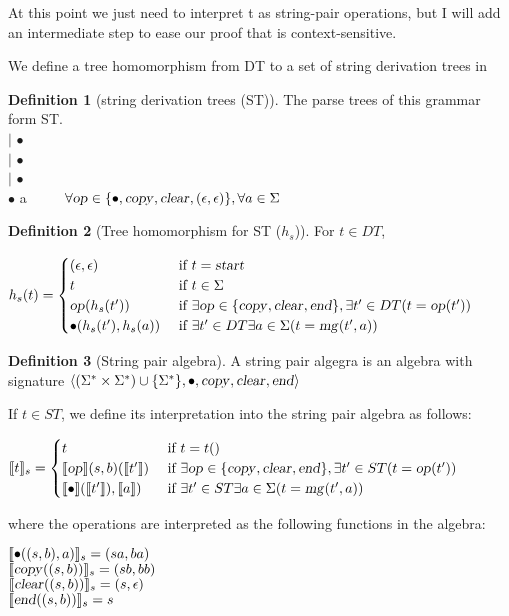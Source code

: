 \documentclass[12pt]{article}
\theoremstyle{definition}
\newtheorem{definition}{Definition}[section]
\begin{document}
At this point we just need to interpret t as string-pair operations, but I will add an intermediate step to ease our proof that \OURG is context-sensitive.

We define a tree homomorphism from DT to a set of string derivation trees in

\begin{definition}[string derivation trees (ST)]
  The parse trees of this grammar form ST.\\
  
\noindent  \cp \arr \cp $|$ $\bullet$\\
  \cl \arr \cp $|$ $\bullet$\\
  \ed \arr \cp $|$ $\bullet$\\
  $\bullet$ \arr \op a ~~~~ $\forall \text{\textsl{op}}\in \{\bullet,\text{\textsl{copy}},\text{\textsl{clear}},(\epsilon,\epsilon)\}, \forall a\in\Sigma$
\end{definition}


\begin{definition}[Tree homomorphism for ST ($h_s$)]

  For $t\in DT$, 
  
  $
  h_s(t) =
  \begin{cases}
    (\epsilon,\epsilon) & \text{ if } t = \text{\textsl{start}}\\
    t & \text{ if } t\in\Sigma\\
    \text{\textsl{op}}(h_s(t')) & \text{ if } \exists \text{\textsl{op}} \in \{\text{\textsl{copy}},\text{\textsl{clear}},\text{\textsl{end}}\}, \exists t'\in DT (t=\text{\textsl{op}}(t'))\\
    \bullet(h_s(t'), h_s(a)) & \text{ if } \exists t'\in DT \exists a\in\Sigma (t=\text{\textsl{mg}}(t',a))\\
  \end{cases}
  $
\end{definition}


\begin{definition}[String pair algebra]
  A string pair algegra is an algebra with signature $\langle (\Sigma^*\times\Sigma^*)\cup\{\Sigma^*\},\bullet,\text{\textsl{copy}},\text{\textsl{clear}},\text{\textsl{end}}\rangle$
  
  If $t\in ST$, we define its interpretation into the string pair algebra as follows:

   $
  \llbracket t \rrbracket_s =
  \begin{cases}
    t & \text{ if } t = t()\\
    \llbracket\text{\textsl{op}}\rrbracket(s,b)(\llbracket t'\rrbracket) & \text{ if } \exists \text{\textsl{op}} \in \{\text{\textsl{copy}},\text{\textsl{clear}},\text{\textsl{end}}\}, \exists t'\in ST (t=\text{\textsl{op}}(t'))\\
    \llbracket\bullet\rrbracket(\llbracket t'\rrbracket), \llbracket a\rrbracket) & \text{ if } \exists t'\in ST \exists a\in\Sigma (t=\text{\textsl{mg}}(t',a))\\
  \end{cases}
  $

  where the operations are interpreted as the following functions in the algebra:
  
\noindent  $\llbracket\bullet((s,b),a)\rrbracket_s = (sa,ba)$\\  
  $\llbracket\text{\textsl{copy}}((s,b))\rrbracket_s = (sb,bb)$\\
  $\llbracket\text{\textsl{clear}}((s,b))\rrbracket_s = (s,\epsilon)$\\
  $\llbracket\text{\textsl{end}}((s,b))\rrbracket_s = s$\\

  
\end{definition}
\end{document}
